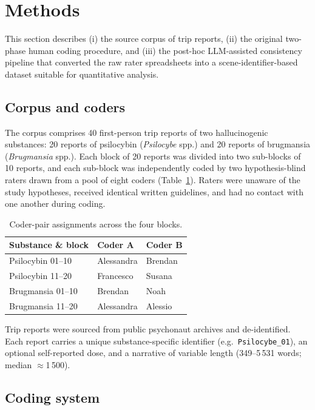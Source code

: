 \section{Methods}
\label{sec:methods}

This section describes (i) the source corpus of trip reports, (ii) the original two-phase human coding procedure, and (iii) the post-hoc LLM-assisted consistency pipeline that converted the raw rater spreadsheets into a scene-identifier-based dataset suitable for quantitative analysis.

\subsection{Corpus and coders}
\label{sec:corpus}

The corpus comprises 40 first-person trip reports of two hallucinogenic substances: 20 reports of psilocybin (\textit{Psilocybe} spp.) and 20 reports of brugmansia (\textit{Brugmansia} spp.). Each block of 20 reports was divided into two sub-blocks of 10 reports, and each sub-block was independently coded by two hypothesis-blind raters drawn from a pool of eight coders (Table~\ref{tab:pairs}). Raters were unaware of the study hypotheses, received identical written guidelines, and had no contact with one another during coding.

\begin{table}[h]
\centering
\begin{tabular}{lll}
\toprule
Substance \& block & Coder A & Coder B \\
\midrule
Psilocybin 01--10 & Alessandra & Brendan \\
Psilocybin 11--20 & Francesco & Susana \\
Brugmansia 01--10 & Brendan & Noah \\
Brugmansia 11--20 & Alessandra & Alessio \\
\bottomrule
\end{tabular}
\caption{Coder-pair assignments across the four blocks.}
\label{tab:pairs}
\end{table}

Trip reports were sourced from public psychonaut archives and de-identified. Each report carries a unique substance-specific identifier (e.g.\ \texttt{Psilocybe\_01}), an optional self-reported dose, and a narrative of variable length (349--5\,531 words; median $\approx$1\,500).

\subsection{Coding system}
\label{sec:taxonomy}

